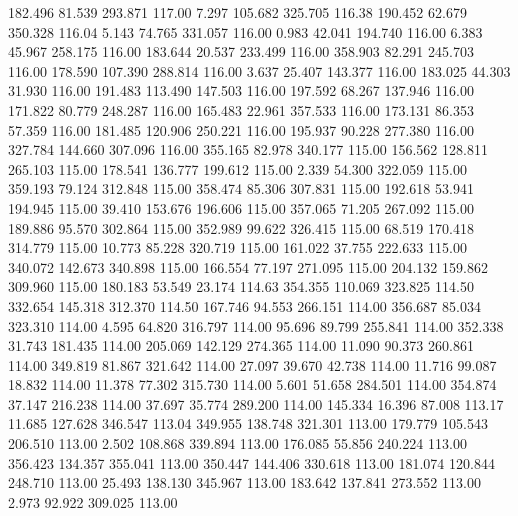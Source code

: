  182.496   81.539  293.871       117.00
   7.297  105.682  325.705       116.38
 190.452   62.679  350.328       116.04
   5.143   74.765  331.057       116.00
   0.983   42.041  194.740       116.00
   6.383   45.967  258.175       116.00
 183.644   20.537  233.499       116.00
 358.903   82.291  245.703       116.00
 178.590  107.390  288.814       116.00
   3.637   25.407  143.377       116.00
 183.025   44.303   31.930       116.00
 191.483  113.490  147.503       116.00
 197.592   68.267  137.946       116.00
 171.822   80.779  248.287       116.00
 165.483   22.961  357.533       116.00
 173.131   86.353   57.359       116.00
 181.485  120.906  250.221       116.00
 195.937   90.228  277.380       116.00
 327.784  144.660  307.096       116.00
 355.165   82.978  340.177       115.00
 156.562  128.811  265.103       115.00
 178.541  136.777  199.612       115.00
   2.339   54.300  322.059       115.00
 359.193   79.124  312.848       115.00
 358.474   85.306  307.831       115.00
 192.618   53.941  194.945       115.00
  39.410  153.676  196.606       115.00
 357.065   71.205  267.092       115.00
 189.886   95.570  302.864       115.00
 352.989   99.622  326.415       115.00
  68.519  170.418  314.779       115.00
  10.773   85.228  320.719       115.00
 161.022   37.755  222.633       115.00
 340.072  142.673  340.898       115.00
 166.554   77.197  271.095       115.00
 204.132  159.862  309.960       115.00
 180.183   53.549   23.174       114.63
 354.355  110.069  323.825       114.50
 332.654  145.318  312.370       114.50
 167.746   94.553  266.151       114.00
 356.687   85.034  323.310       114.00
   4.595   64.820  316.797       114.00
  95.696   89.799  255.841       114.00
 352.338   31.743  181.435       114.00
 205.069  142.129  274.365       114.00
  11.090   90.373  260.861       114.00
 349.819   81.867  321.642       114.00
  27.097   39.670   42.738       114.00
  11.716   99.087   18.832       114.00
  11.378   77.302  315.730       114.00
   5.601   51.658  284.501       114.00
 354.874   37.147  216.238       114.00
  37.697   35.774  289.200       114.00
 145.334   16.396   87.008       113.17
  11.685  127.628  346.547       113.04
 349.955  138.748  321.301       113.00
 179.779  105.543  206.510       113.00
   2.502  108.868  339.894       113.00
 176.085   55.856  240.224       113.00
 356.423  134.357  355.041       113.00
 350.447  144.406  330.618       113.00
 181.074  120.844  248.710       113.00
  25.493  138.130  345.967       113.00
 183.642  137.841  273.552       113.00
   2.973   92.922  309.025       113.00
